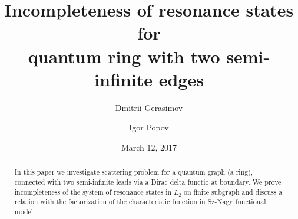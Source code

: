 \documentclass{birkjour}
\theoremstyle{definition}
\theoremstyle{remark}
\numberwithin{equation}{section}
\begin{document}
%
%
%
%
%
%
%
%
%


\title[Incompleteness of resonance states]
 {Incompleteness of resonance states for \\
 quantum ring with two semi-infinite edges}



\author[D.A. Gerasimov]{Dmitrii Gerasimov}
\address{
ITMO University\\
Saint Petersburg, Russia
}

\author[I. Y. Popov]{Igor Popov}
\address{
ITMO University\\
Saint Petersburg, Russia
}


\date{March 12, 2017}

\begin{abstract}
In this paper we investigate scattering problem for a quantum graph (a ring), connected
with two semi-infinite leads via a Dirac delta functio at boundary. We prove
incompleteness of the system of resonance states in $L_2$ on finite subgraph and
discuss a relation with the factorization of the characteristic function in Sz-Nagy functional model.
\end{abstract}

\maketitle
\end{document}
